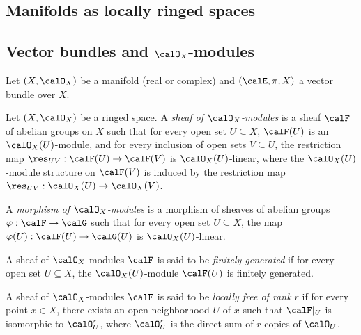 \subsection{Manifolds as locally ringed spaces}

    

\subsection[Vector bundles and O\_X-modules]{Vector bundles and \(\calO_X\)-modules}

    Let \((X,\calO_X)\) be a manifold (real or complex) and \((\calE, \pi, X)\) a vector bundle over \(X\).


    \begin{definition}\label{def:sheaf_of_modules}
        Let \((X,\calO_X)\) be a ringed space.
        A \emph{sheaf of \(\calO_X\)-modules} is a sheaf \(\calF\) of abelian groups on \(X\) such that for every open set \(U\subseteq X\), 
        \(\calF(U)\) is an \(\calO_X(U)\)-module, 
        and for every inclusion of open sets \(V\subseteq U\), the restriction map \(\res_{UV}:\calF(U)\to \calF(V)\) is \(\calO_X(U)\)-linear, 
        where the \(\calO_X(U)\)-module structure on \(\calF(V)\) is induced by the restriction map \(\res_{UV}:\calO_X(U)\to \calO_X(V)\).
        
        A \emph{morphism of \(\calO_X\)-modules} is a morphism of sheaves of abelian groups \(\varphi:\calF\to \calG\) such that 
        for every open set \(U\subseteq X\), the map \(\varphi(U):\calF(U)\to \calG(U)\) is \(\calO_X(U)\)-linear.
    \end{definition}


    \begin{definition}\label{def:finitely_generated_O_X_modules}
        A sheaf of \(\calO_X\)-modules \(\calF\) is said to be \emph{finitely generated} if for every open set \(U \subseteq X\), the \(\calO_X(U)\)-module \(\calF(U)\) is finitely generated.
    \end{definition}

    \begin{definition}\label{def:locally_free_O_X_modules}
        A sheaf of \(\calO_X\)-modules \(\calF\) is said to be \emph{locally free of rank \(r\)} if for every point \(x \in X\), there exists an open neighborhood \(U\) of \(x\) such that \(\calF|_U\) is isomorphic to \(\calO_U^r\), 
        where \(\calO_U^r\) is the direct sum of \(r\) copies of \(\calO_U\).
    \end{definition}

